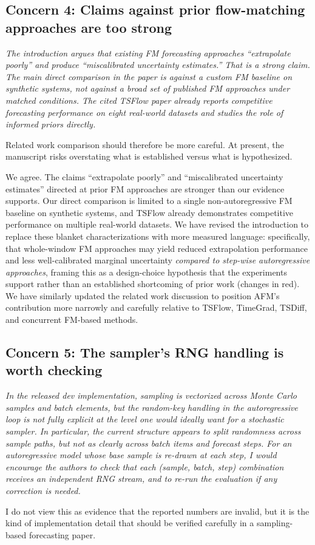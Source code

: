 \documentclass[11pt]{article}
\newcommand{\reviewertext}[1]{%
  \begin{reviewerquote}
    {\color{reviewercolor}\itshape #1}
  \end{reviewerquote}%
}
\newcommand{\authorresponse}[1]{%
    #1\par\medskip
}
\begin{document}
\subsection{Concern 4: Claims against prior flow-matching approaches are too strong}

\reviewertext{%
The introduction argues that existing FM forecasting approaches ``extrapolate poorly'' and produce ``miscalibrated uncertainty estimates.'' That is a strong claim. The main direct comparison in the paper is against a custom FM baseline on synthetic systems, not against a broad set of published FM approaches under matched conditions. The cited TSFlow paper already reports competitive forecasting performance on eight real-world datasets and studies the role of informed priors directly.

Related work comparison should therefore be more careful. At present, the manuscript risks overstating what is established versus what is hypothesized.
}

\authorresponse{%
We agree. The claims ``extrapolate poorly'' and ``miscalibrated uncertainty estimates'' directed at prior FM approaches are stronger than our evidence supports. Our direct comparison is limited to a single non-autoregressive FM baseline on synthetic systems, and TSFlow already demonstrates competitive performance on multiple real-world datasets.
We have revised the introduction to replace these blanket characterizations with more measured language: specifically, that whole-window FM approaches may yield reduced extrapolation performance and less well-calibrated marginal uncertainty \emph{compared to step-wise autoregressive approaches}, framing this as a design-choice hypothesis that the experiments support rather than an established shortcoming of prior work (changes in red). We have similarly updated the related work discussion to position AFM's contribution more narrowly and carefully relative to TSFlow, TimeGrad, TSDiff, and concurrent FM-based methods.}

\subsection{Concern 5: The sampler's RNG handling is worth checking}

\reviewertext{%
In the released dev implementation, sampling is vectorized across Monte Carlo samples and batch elements, but the random-key handling in the autoregressive loop is not fully explicit at the level one would ideally want for a stochastic sampler. In particular, the current structure appears to split randomness across sample paths, but not as clearly across batch items and forecast steps. For an autoregressive model whose base sample is re-drawn at each step, I would encourage the authors to check that each (sample, batch, step) combination receives an independent RNG stream, and to re-run the evaluation if any correction is needed.

I do not view this as evidence that the reported numbers are invalid, but it is the kind of implementation detail that should be verified carefully in a sampling-based forecasting paper.
}
\end{document}
